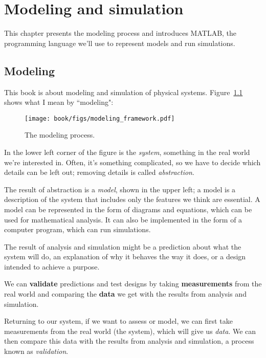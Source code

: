 \chapter{Modeling and simulation}
\label{modeling}

\minitoc{}

This chapter presents the modeling process and introduces MATLAB, the programming language we'll use to represent models and run simulations.


\section{Modeling}

This book is about modeling and simulation of physical systems.  
Figure~\ref{fig:modeling} shows what I mean by ``modeling":


\begin{figure}[h]
  \texttt{[image: book/figs/modeling\_framework.pdf]} 
  \caption{The modeling process.}
  \label{fig:modeling}
\end{figure}

In the lower left corner of the figure is the \emph{system}, something in the real world we're interested in.  Often, it's something complicated, so we have to decide which 
details can be left out; removing details is called \emph{abstraction}.  


The result of abstraction is a \emph{model}, shown in the upper left; a model is a description of the system that includes only the features we think are essential.  A model can be represented in the form of diagrams and equations, which can be used for mathematical analysis.  It can also be implemented in the form of a computer program, which can run simulations.


The result of analysis and simulation might be a prediction about what the system will do, an explanation of why it behaves the way it does, or a design intended to achieve a purpose.  


We can {\bf validate} predictions and test designs by taking {\bf measurements} from the real world and comparing the {\bf data} we get with the results from analysis and simulation. 

Returning to our system, if we want to assess or model, we can first take measurements from the real world (the system), which will give us \emph{data}. We can then compare this data with the results from analysis and simulation, a process known as \emph{validation}. 

